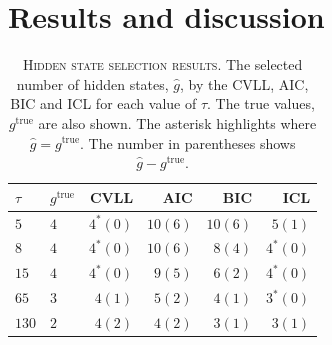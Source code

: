 \section{Results and discussion}\label{sec:hmm_results}
\begin{table}
    \centering
    \caption[Hidden state selection results]{\textsc{Hidden state selection results}. The selected number of hidden states, $\hat{g}$, by the CVLL, AIC, BIC and ICL for each value of $\tau$. The true values, $g^{\mathrm{true}}$ are also shown. The asterisk highlights where $\hat{g}=g^{\mathrm{true}}$. The number in parentheses shows $\hat{g}-g^{\mathrm{true}}$. }
    \begin{tabular}{llrrrr}
    \toprule
    $\tau$ & $g^{\mathrm{true}}$ & CVLL & AIC & BIC & ICL  \\
    \midrule
     $5$  & $4$ & $4^{*} (0)$  & $10 (6)$ & $10 (6)$ & $5 (1)$ \\
     $8$  & $4$ & $4^{*} (0)$ & $10 (6)$ & $8 (4)$  & $4^{*} (0)$  \\
     $15$ & $4$ & $4^{*} (0)$  & $9 (5)$ & $6 (2)$  & $4^{*} (0)$  \\
     $65 $& $3$ & $4 (1)$  & $5 (2)$  & $4 (1)$  & $3^{*} (0)$  \\
     $130$& $2$ & $4 (2)$  & $4 (2)$  & $3 (1)$  & $3 (1)$  \\
     \bottomrule
    \end{tabular}
    \label{tab:prinz_criteria_results}
\end{table}

